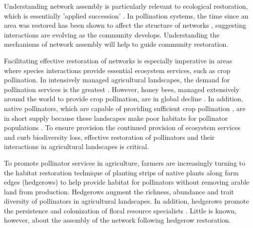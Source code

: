 \documentclass[12pt]{article}
\begin{document}
Understanding network assembly is particularly relevant to ecological
restoration, which is essentially 'applied succession'
\citep[e.g.,]{parker1997scale}. In pollination systems, the time since
an area was restored has been shown to affect the structure of
networks \citep{forup-2008-742, forup2008restoration,
  devoto2012understanding}, suggesting interactions are evolving as
the community develops. Understanding the mechanisms of network
assembly will help to guide community restoration.

Facilitating effective restoration of networks is especially
imperative in areas where species interactions provide essential
ecosystem services, such as crop pollination. In intensively managed
agricultural landscapes, the demand for pollination services is the
greatest \citep{kremen-2008-10}. However, honey bees, managed
extensively around the world to provide crop pollination, are in
global decline \citep{neumann-2010-1, van-engelsdorp-2009-e6481}. In
addition, native pollinators, which are capable of providing
sufficient crop pollination \citep{kremen-2002-16816,
  winfree-2007-1105, kremen-2004-1109}, are in short supply because
these landscapes make poor habitats for pollinator populations
\citep{kremen-2002-16816}. To ensure provision the continued provision
of ecosystem services and curb biodiversity loss, effective
restoration of pollinators and their interactions in agricultural
landscapes is critical.

To promote pollinator services in agriculture, farmers are
increasingly turning to the habitat restoration technique of planting
strips of native plants along farm edges (hedgerows) to help provide
habitat for pollinators without removing arable land from
production. Hedgerows augment the richness, abundance and trait
diversity of pollinators in agricultural
landscapes\citep{morandin-2013-829, mgonigle-2015-x, kremen-2015-602,
  ponisio2015farm}. In addition, hedgerows promote the persistence and
colonization of floral resource specialists
\citep{mgonigle-2015-x}. Little is known, however, about the assembly
of the network following hedgerow restoration.
\end{document}
